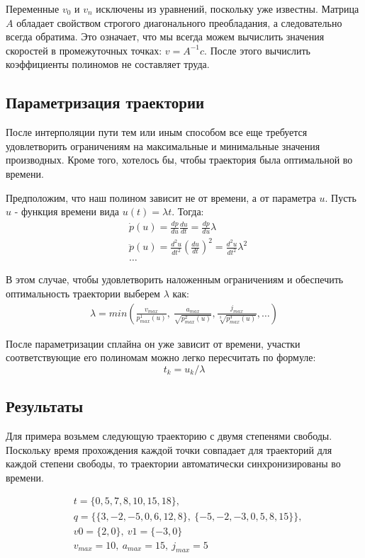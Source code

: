 Переменные $v_{0}$ и $v_{n}$ исключены из уравнений, поскольку уже известны. Матрица $A$ обладает свойством строгого диагонального преобладания\cite{DDMWiki}, а следовательно всегда обратима. Это означает, что мы всегда можем вычислить значения скоростей в промежуточных точках: $v = A^{-1}c$. После этого вычислить коэффициенты полиномов не составляет труда.


\subsection{Параметризация траектории} \label{subsect2_2_2}
После интерполяции пути тем или иным способом все еще требуется удовлетворить ограничениям на максимальные и минимальные значения производных. Кроме того, хотелось бы, чтобы траектория была оптимальной во времени.

Предположим, что наш полином зависит не от времени, а от параметра $u$. Пусть $u$ - функция времени вида $u(t) = \lambda t$. Тогда:
\begin{align*}
	&\dot{p}(u) = \frac{dp}{du}\frac{du}{dt} = \frac{dp}{du}\lambda \\
	&\ddot{p}(u) = \frac{d^{2}u}{dt^{2}}(\frac{du}{dt})^{2} = \frac{d^{2}u}{dt^{2}}\lambda^{2}\\
	&\dotso
\end{align*}

В этом случае, чтобы удовлетворить наложенным ограничениям и обеспечить оптимальность траектории выберем $\lambda$ как:
\begin{align*}
	\lambda = min(\frac{v_{max}}{p_{max}^{1}(u)},\ \frac{a_{max}}{\sqrt{p_{max}^{2}(u)}}, \frac{j_{max}}{\sqrt[3]{p_{max}^{3}(u)}}, \dots)   
\end{align*}

После параметризации сплайна он уже зависит от времени, участки соответствующие его полиномам можно легко пересчитать по формуле:
\[
	t_{k} = u_{k} / \lambda
\]

\subsection{Результаты} \label{subsect2_2_3}
Для примера возьмем следующую траекторию с двумя степенями свободы. Поскольку время прохождения каждой точки совпадает для траекторий для каждой степени свободы, то траектории автоматически синхронизированы во времени.

\begin{align*}
	&t = \{0, 5, 7, 8, 10, 15, 18\},\\
	&q = \{\{3, -2, -5, 0, 6, 12, 8\},\ \{-5, -2, -3, 0, 5, 8, 15\}\},\\
	&v0 = \{2, 0\},\ v1 = \{-3, 0\}\\
	&v_{max} = 10,\ a_{max} = 15,\ j_{max} = 5
\end{align*}

